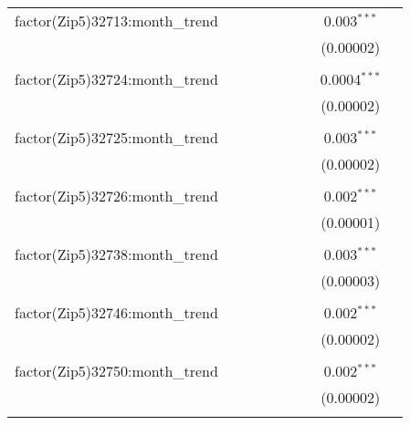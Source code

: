 \begin{table}[H]
{\begin{tabular}{@{\extracolsep{5pt}}lcccccccc}
  factor(Zip5)32713:month\_trend &  &  &  &  &  &  & 0.003$^{***}$ &  \\  

   &  &  &  &  &  &  & (0.00002) &  \\  

   & & & & & & & & \\  

  factor(Zip5)32724:month\_trend &  &  &  &  &  &  & 0.0004$^{***}$ &  \\  

   &  &  &  &  &  &  & (0.00002) &  \\  

   & & & & & & & & \\  

  factor(Zip5)32725:month\_trend &  &  &  &  &  &  & 0.003$^{***}$ &  \\  

   &  &  &  &  &  &  & (0.00002) &  \\  

   & & & & & & & & \\  

  factor(Zip5)32726:month\_trend &  &  &  &  &  &  & 0.002$^{***}$ &  \\  

   &  &  &  &  &  &  & (0.00001) &  \\  

   & & & & & & & & \\  

  factor(Zip5)32738:month\_trend &  &  &  &  &  &  & 0.003$^{***}$ &  \\  

   &  &  &  &  &  &  & (0.00003) &  \\  

   & & & & & & & & \\  

  factor(Zip5)32746:month\_trend &  &  &  &  &  &  & 0.002$^{***}$ &  \\  

   &  &  &  &  &  &  & (0.00002) &  \\  

   & & & & & & & & \\  

  factor(Zip5)32750:month\_trend &  &  &  &  &  &  & 0.002$^{***}$ &  \\  

   &  &  &  &  &  &  & (0.00002) &  \\  

   & & & & & & & & \\  


\end{tabular}}
\end{table}
